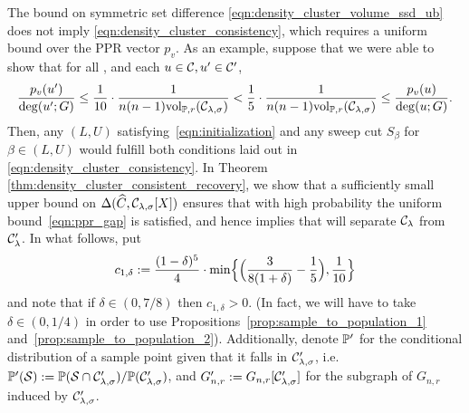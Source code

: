 The bound on symmetric set difference \eqref{eqn:density_cluster_volume_ssd_ub} does not imply \eqref{eqn:density_cluster_consistency}, which requires a
uniform bound over the PPR vector $p_v$. As an example, suppose that we were
able to show that for all , and each $u \in \mathcal{C}, u' \in \mathcal{C}'$,  
\begin{equation}
\label{eqn:ppr_gap}
\frac{p_v(u')}{\deg(u';G)} \leq \frac{1}{10} \cdot \frac{1}{n (n - 1) \mathrm{vol}_{\mathbb{P},r}(\mathcal{C}_{\lambda,\sigma})} <
\frac{1}{5} \cdot \frac{1}{n (n-1) \mathrm{vol}_{\mathbb{P},r}(\mathcal{C}_{\lambda,\sigma})} \leq \frac{p_v(u)}{\deg(u;G)}. 
\end{equation}
Then, any $(L,U)$ satisfying~\eqref{eqn:initialization} and any sweep cut
$S_{\beta}$ for $\beta \in (L,U)$ would fulfill both conditions laid out in
\eqref{eqn:density_cluster_consistency}. In Theorem 
\ref{thm:density_cluster_consistent_recovery}, we show that a sufficiently 
small upper bound on $\Delta(\widehat{C},\mathcal{C}_{\lambda,\sigma}[X])$ ensures that with high probability the uniform bound~\eqref{eqn:ppr_gap} is satisfied, and hence implies
that  will separate $\mathcal{C}_{\lambda}$ from $\mathcal{C}_{\lambda}'$. In what follows, put
\begin{equation*}
c_{1,\delta} := \frac{(1 - \delta)^5}{4} \cdot \min\Bigl\{\Bigl(\frac{3}{8(1 + \delta)} - \frac{1}{5}\Bigr),\frac{1}{10}\Bigr\}
\end{equation*}
and note that if $\delta \in (0,7/8)$ then $c_{1,\delta} > 0$. (In fact, we will have to take $\delta \in (0,1/4)$ in order to use Propositions~\ref{prop:sample_to_population_1} and~\ref{prop:sample_to_population_2}). Additionally, denote $\mathbb{P}'$ for the conditional distribution of a sample point given that it falls in $\mathcal{C}_{\lambda,\sigma}'$, i.e. $\mathbb{P}'(\mathcal{S}) := \mathbb{P}(\mathcal{S} \cap \mathcal{C}_{\lambda,\sigma}')/\mathbb{P}(\mathcal{C}_{\lambda,\sigma}')$, and $G_{n,r}' := G_{n,r}[\mathcal{C}_{\lambda,\sigma}']$ for the subgraph of $G_{n,r}$ induced by $\mathcal{C}_{\lambda,\sigma}'$. 

